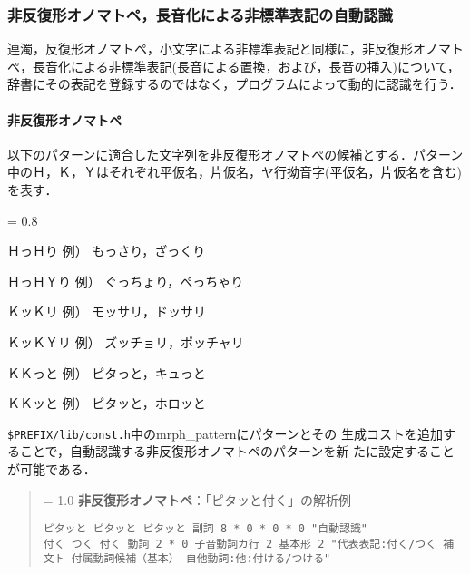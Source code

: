 \documentclass[a4j,titlepage]{jarticle}
\begin{document}
\subsubsection{非反復形オノマトペ，長音化による非標準表記の自動認識}

連濁，反復形オノマトペ，小文字による非標準表記と同様に，非反復形オノマト
ペ，長音化による非標準表記(長音による置換，および，長音の挿入)について，
辞書にその表記を登録するのではなく，プログラムによって動的に認識を行う．

\noindent
\paragraph{非反復形オノマトペ}
以下のパターンに適合した文字列を非反復形オノマトペの候補とする．パターン
中のＨ，Ｋ，Ｙはそれぞれ平仮名，片仮名，ヤ行拗音字(平仮名，片仮名を含む)
を表す．

\begin{itemize}
{\baselineskip = 0.8 \baselineskip
 \item ＨっＨり   \hspace{2em}例） もっさり，ざっくり
 \item ＨっＨＹり \hspace{1em}例） ぐっちょり，ぺっちゃり
 \item ＫッＫリ   \hspace{2em}例） モッサリ，ドッサリ
 \item ＫッＫＹリ \hspace{1em}例） ズッチョリ，ポッチャリ
 \item ＫＫっと   \hspace{2em}例） ピタっと，キュっと
 \item ＫＫッと   \hspace{2em}例） ピタッと，ホロッと
}
\end{itemize}

\noindent \texttt{\$PREFIX/lib/const.h}中のmrph\_patternにパターンとその
生成コストを追加することで，自動認識する非反復形オノマトペのパターンを新
たに設定することが可能である．

\begin{quote}
{\baselineskip = 1.0 \baselineskip
{\bf 非反復形オノマトペ}：「ピタッと付く」の解析例\vspace{-2ex}
\begin{verbatim}
ピタッと ピタッと ピタッと 副詞 8 * 0 * 0 * 0 "自動認識"
付く つく 付く 動詞 2 * 0 子音動詞カ行 2 基本形 2 "代表表記:付く/つく 補文ト 付属動詞候補（基本） 自他動詞:他:付ける/つける"
\end{verbatim}
}
\end{quote}
\end{document}
